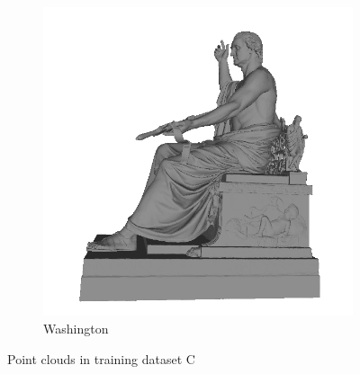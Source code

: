 \begin{figure}
\begin{subfigure}[b]{0.23\linewidth}
	\includegraphics[width=\linewidth]{./Figures/test-dataset/04.washington.png}
	\caption{Washington}
\end{subfigure}
	
	\label{fig:dataset_c}
	\caption{Point clouds in training dataset C}
\end{figure}
